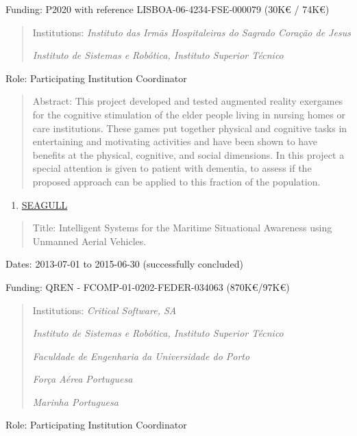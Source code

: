 \documentclass[
]{article}
\begin{document}
Funding: P2020 with reference LISBOA-06-4234-FSE-000079 (30K€ / 74K€)

\begin{quote}
Institutions: \emph{Instituto das Irmãs Hospitaleiras do Sagrado Coração
de Jesus}

\emph{Instituto de Sistemas e Robótica, Instituto Superior Técnico}
\end{quote}

Role: Participating Institution Coordinator

\begin{quote}
Abstract: This project developed and tested augmented reality exergames
for the cognitive stimulation of the elder people living in nursing
homes or care institutions. These games put together physical and
cognitive tasks in entertaining and motivating activities and have been
shown to have benefits at the physical, cognitive, and social
dimensions. In this project a special attention is given to patient with
dementia, to assess if the proposed approach can be applied to this
fraction of the population.
\end{quote}

\begin{enumerate}
\def\labelenumi{\arabic{enumi}.}
\setcounter{enumi}{3}
\item
  \ul{SEAGULL}
\end{enumerate}

\begin{quote}
Title: Intelligent Systems for the Maritime Situational Awareness using
Unmanned Aerial Vehicles.
\end{quote}

Dates: 2013-07-01 to 2015-06-30 (successfully concluded)

Funding: QREN - FCOMP-01-0202-FEDER-034063 (870K€/97K€)

\begin{quote}
Institutions: \emph{Critical Software, SA}

\emph{Instituto de Sistemas e Robótica, Instituto Superior Técnico}

\emph{Faculdade de Engenharia da Universidade do Porto}

\emph{Força Aérea Portuguesa}

\emph{Marinha Portuguesa}
\end{quote}

Role: Participating Institution Coordinator
\end{document}
